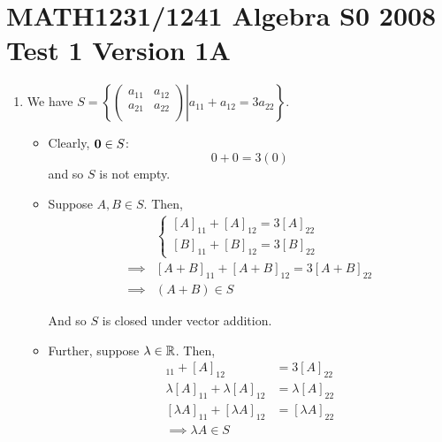\section*{MATH1231/1241 Algebra S0 2008 Test 1 Version 1A}
\begin{enumerate}
    \item
        We have $S = \left\{ \left. \begin{pmatrix}
            a_{11} & a_{12} \\
            a_{21} & a_{22} \\
        \end{pmatrix} \right| a_{11} + a_{12} = 3a_{22} \right\}$.

        \begin{itemize}
            \item
                Clearly, $\mathbf{0} \in S$:
                $$0 + 0 = 3(0)$$
                and so $S$ is not empty.

            \item
                Suppose $A, B \in S$. Then,
                \begin{align*}
                    &\left\{\begin{matrix}
                        [A]_{11} + [A]_{12} = 3[A]_{22} \\
                        [B]_{11} + [B]_{12} = 3[B]_{22}
                    \end{matrix}\right. \\
                    \implies
                    &[A+B]_{11} + [A+B]_{12} = 3[A+B]_{22} \\
                    \implies
                    &(A + B) \in S
                \end{align*}

                And so $S$ is closed under vector addition.

            \item
                Further, suppose $\lambda \in \mathbb{R}$. Then,
                \begin{align*}
                    [A]_{11} + [A]_{12} &= 3[A]_{22} \\
                    \lambda[A]_{11} + \lambda[A]_{12} &= \lambda[A]_{22} \\
                    [\lambda A]_{11} +  [\lambda A]_{12} &=  [\lambda A]_{22} \\
                    \implies
                    \lambda A \in S
                \end{align*}


\end{itemize}
\end{enumerate}

